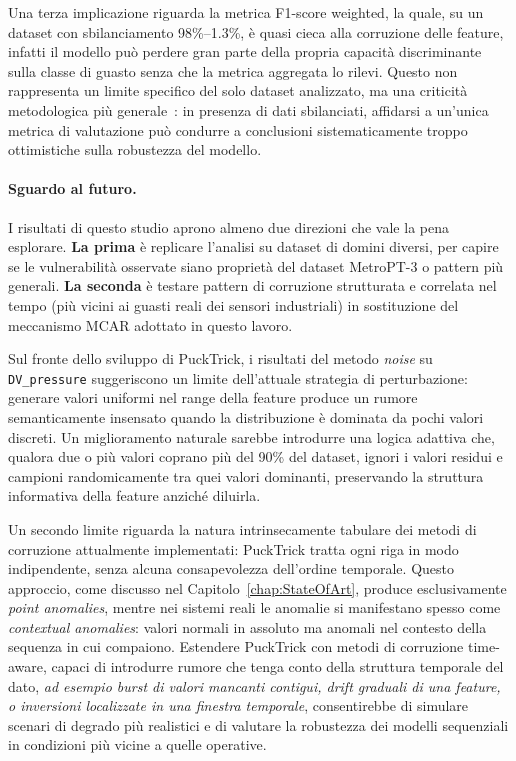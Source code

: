\documentclass[../main.tex]{subfiles}
\begin{document}
Una terza implicazione riguarda la metrica F1-score weighted, la quale, su un dataset con sbilanciamento 98\%--1.3\%, è quasi cieca alla corruzione delle feature, infatti il modello può perdere gran parte della propria capacità discriminante sulla classe di guasto senza che la metrica aggregata lo rilevi. Questo non rappresenta un limite specifico del solo dataset analizzato, ma una criticità metodologica più generale~\cite{buda2018systematic, johnson2019survey}: in presenza di dati sbilanciati, affidarsi a un'unica metrica di valutazione può condurre a conclusioni sistematicamente troppo ottimistiche sulla robustezza del modello.

\paragraph{Sguardo al futuro.}
I risultati di questo studio aprono almeno due direzioni che vale la pena esplorare. \textbf{La prima} è replicare l'analisi su dataset di domini diversi, per capire se le vulnerabilità osservate siano proprietà del dataset MetroPT-3 o pattern più generali. \textbf{La seconda} è testare pattern di corruzione strutturata e correlata nel tempo (più vicini ai guasti reali dei sensori industriali) in sostituzione del meccanismo MCAR adottato in questo lavoro.

Sul fronte dello sviluppo di PuckTrick, i risultati del metodo \textit{noise} su \texttt{DV\_pressure} suggeriscono un limite dell'attuale strategia di perturbazione: generare valori uniformi nel range della feature produce un rumore semanticamente insensato quando la distribuzione è dominata da pochi valori discreti. Un miglioramento naturale sarebbe introdurre una logica adattiva che, qualora due o più valori coprano più del 90\% del dataset, ignori i valori residui e campioni randomicamente tra quei valori dominanti, preservando la struttura informativa della feature anziché diluirla.

Un secondo limite riguarda la natura intrinsecamente tabulare dei metodi di corruzione attualmente implementati: PuckTrick tratta ogni riga in modo indipendente, senza alcuna consapevolezza dell'ordine temporale. Questo approccio, come discusso nel Capitolo~\ref{chap:StateOfArt}, produce esclusivamente \textit{point anomalies}, mentre nei sistemi reali le anomalie si manifestano spesso come \textit{contextual anomalies}: valori normali in assoluto ma anomali nel contesto della sequenza in cui compaiono. Estendere PuckTrick con metodi di corruzione time-aware, capaci di introdurre rumore che tenga conto della struttura temporale del dato, \textit{ad esempio burst di valori mancanti contigui, drift graduali di una feature, o inversioni localizzate in una finestra temporale}, consentirebbe di simulare scenari di degrado più realistici e di valutare la robustezza dei modelli sequenziali in condizioni più vicine a quelle operative.
\end{document}
